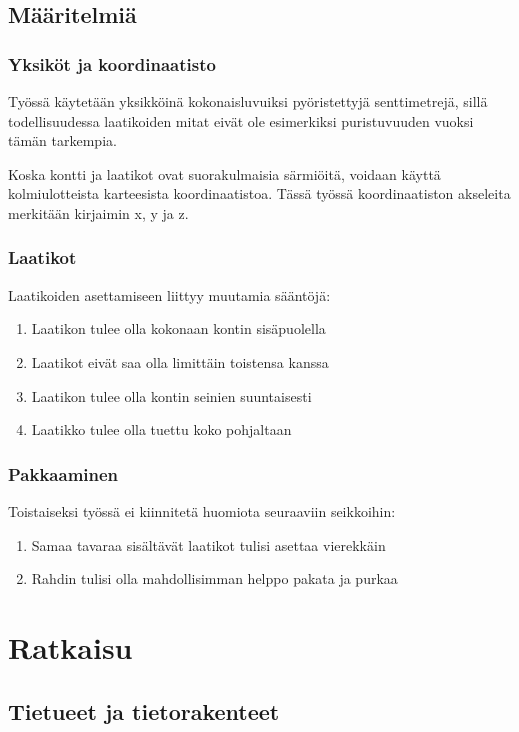 \documentclass[a4paper,12pt, titlepage]{article}
\begin{document}
\subsection*{Määritelmiä}
\subsubsection*{Yksiköt ja koordinaatisto}
Työssä käytetään yksikköinä kokonaisluvuiksi pyöristettyjä senttimetrejä, sillä todellisuudessa laatikoiden mitat eivät ole esimerkiksi puristuvuuden vuoksi tämän tarkempia. \newline

\noindent
Koska kontti ja laatikot ovat suorakulmaisia särmiöitä, voidaan käyttä kolmiulotteista karteesista koordinaatistoa. Tässä työssä koordinaatiston akseleita merkitään kirjaimin x, y ja z.

\subsubsection*{Laatikot}
Laatikoiden asettamiseen liittyy muutamia sääntöjä:
\begin{enumerate}
	\item Laatikon tulee olla kokonaan kontin sisäpuolella
	\item Laatikot eivät saa olla limittäin toistensa kanssa
	\item Laatikon tulee olla kontin seinien suuntaisesti
	\item Laatikko tulee olla tuettu koko pohjaltaan
\end{enumerate}


\subsubsection*{Pakkaaminen}
Toistaiseksi työssä ei kiinnitetä huomiota seuraaviin seikkoihin:

\begin{enumerate}
	\item Samaa tavaraa sisältävät laatikot tulisi asettaa vierekkäin
	\item Rahdin tulisi olla mahdollisimman helppo pakata ja purkaa
\end{enumerate}

\section*{Ratkaisu}
\subsection*{Tietueet ja tietorakenteet}
\end{document}
